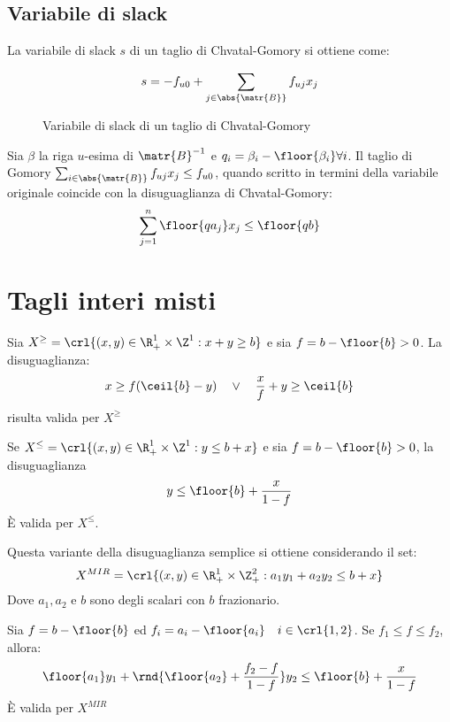 \documentclass[\main/main.tex]{subfiles}
\begin{document}
\subsection{Variabile di slack}
La variabile di slack \(s\) di un taglio di Chvatal-Gomory si ottiene come:

\begin{figure}
    \[
        s = -f_{u0} + \sum_{j \in \abs{\matr{B}}} f_{uj}x_{j}
    \]    \caption{Variabile di slack di un taglio di Chvatal-Gomory}
\end{figure}

\begin{proposition}
    Sia \(\beta \) la riga \(u\)-esima di \(\matr{B}^{-1}\) e \(q_i = \beta_i - \floor{\beta_i} \forall i\). Il taglio di Gomory \(\sum_{i \in \abs{\matr{B}}} f_{uj}x_j \leq f_{u0}\), quando scritto in termini della variabile originale coincide con la disuguaglianza di Chvatal-Gomory:
    \[
        \sum_{j=1}^n \floor{qa_j}x_j \leq \floor{qb}
    \]\end{proposition}
\clearpage
\section{Tagli interi misti}
\begin{proposition}
    Sia \(X^{\geq} = \crl{(x,y) \in \R^1_+ \times \Z^1: x+y \geq b}\) e sia \(f = b - \floor{b} > 0\). La disuguaglianza:
    \[
        x \geq f(\ceil{b}-y) \quad \lor \quad \frac{x}{f} + y \geq \ceil{b}
    \]    risulta valida per \(X^{\geq}\)
\end{proposition}

\begin{corollary}
    Se \(X^{\leq} = \crl{(x,y) \in \R^1_+ \times \Z^1: y \leq b + x}\) e sia \(f = b - \floor{b} > 0\), la disuguaglianza
    \[
        y \leq \floor{b} + \frac{x}{1-f}
    \]    È valida per \(X^{\leq}\).
\end{corollary}

\begin{proposition}
    Questa variante della disuguaglianza semplice si ottiene considerando il set:
    \[
        X^{MIR} = \crl{(x,y) \in \R^1_+ \times \Z^2_+: a_1y_1 + a_2y_2 \leq b+x}
    \]    Dove \(a_1, a_2\) e \(b\) sono degli scalari con \(b\) frazionario.

    Sia \(f = b - \floor{b}\) ed \(f_i = a_i - \floor{a_i} \quad i \in \crl{1,2}\). Se \(f_1 \leq f \leq f_2\), allora:
    \[
        \floor{a_1}y_1 + \rnd{\floor{a_2} + \frac{f_2 - f}{1-f}}y_2 \leq \floor{b} + \frac{x}{1-f}
    \]    È valida per \(X^{MIR}\)
\end{proposition}
\end{document}
